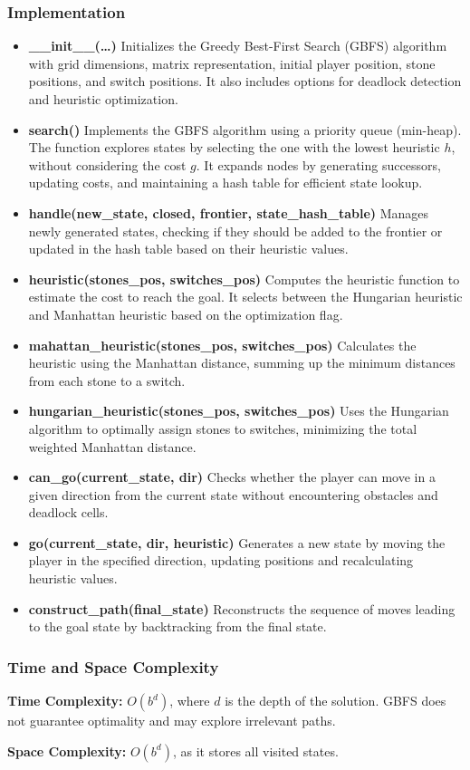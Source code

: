\subsubsection{Implementation}
\begin{itemize}
	\item \textbf{\_\_init\_\_(\ldots)}
	      Initializes the Greedy Best-First Search (GBFS) algorithm with grid dimensions, matrix representation, initial player position, stone positions, and switch positions. It also includes options for deadlock detection and heuristic optimization.

	\item \textbf{search()}
	      Implements the GBFS algorithm using a priority queue (min-heap). The function explores states by selecting the one with the lowest heuristic \( h \), without considering the cost \( g \). It expands nodes by generating successors, updating costs, and maintaining a hash table for efficient state lookup.

	\item \textbf{handle(new\_state, closed, frontier, state\_hash\_table)}
	      Manages newly generated states, checking if they should be added to the frontier or updated in the hash table based on their heuristic values.

	\item \textbf{heuristic(stones\_pos, switches\_pos)}
	      Computes the heuristic function to estimate the cost to reach the goal. It selects between the Hungarian heuristic and Manhattan heuristic based on the optimization flag.

	\item \textbf{mahattan\_heuristic(stones\_pos, switches\_pos)}
	      Calculates the heuristic using the Manhattan distance, summing up the minimum distances from each stone to a switch.

	\item \textbf{hungarian\_heuristic(stones\_pos, switches\_pos)}
	      Uses the Hungarian algorithm to optimally assign stones to switches, minimizing the total weighted Manhattan distance.

	\item \textbf{can\_go(current\_state, dir)}
	      Checks whether the player can move in a given direction from the current state without encountering obstacles and deadlock cells.

	\item \textbf{go(current\_state, dir, heuristic)}
	      Generates a new state by moving the player in the specified direction, updating positions and recalculating heuristic values.

	\item \textbf{construct\_path(final\_state)}
	      Reconstructs the sequence of moves leading to the goal state by backtracking from the final state.

\end{itemize}

\subsubsection{Time and Space Complexity}
\textbf{Time Complexity:} \( O(b^d) \), where \( d \) is the depth of the solution. GBFS does not guarantee optimality and may explore irrelevant paths.

\textbf{Space Complexity:} \( O(b^d) \), as it stores all visited states.
